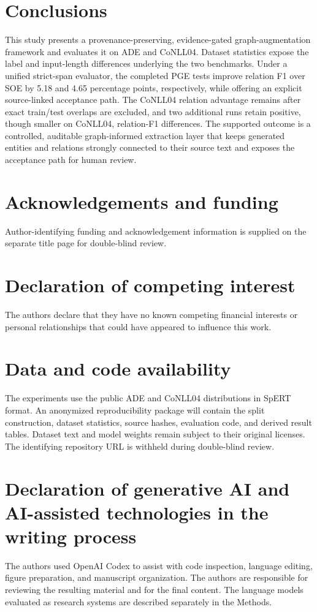 \documentclass[preprint,12pt]{elsarticle}
\begin{document}
\section{Conclusions}
\label{sec:conclusion}
This study presents a provenance-preserving, evidence-gated graph-augmentation
framework and evaluates it on ADE and CoNLL04. Dataset statistics expose the
label and input-length differences underlying the two benchmarks. Under a
unified strict-span evaluator, the completed PGE tests improve relation F1
over SOE by 5.18 and 4.65 percentage points, respectively, while offering an
explicit source-linked acceptance path. The CoNLL04 relation advantage remains
after exact train/test overlaps are excluded, and two additional runs retain
positive, though smaller on CoNLL04, relation-F1 differences. The supported outcome is a
controlled, auditable graph-informed extraction layer that keeps generated
entities and relations strongly connected to their source text and exposes the
acceptance path for human review.

\section*{Acknowledgements and funding}
Author-identifying funding and acknowledgement information is supplied on the
separate title page for double-blind review.
\section*{Declaration of competing interest}
The authors declare that they have no known competing financial interests or
personal relationships that could have appeared to influence this work.
\section*{Data and code availability}
The experiments use the public ADE and CoNLL04 distributions in SpERT format.
An anonymized reproducibility package will contain the split construction,
dataset statistics, source hashes, evaluation code, and derived result tables.
Dataset text and model weights remain subject to their original licenses.
The identifying repository URL is withheld during double-blind review.
\section*{Declaration of generative AI and AI-assisted technologies in the writing process}
The authors used OpenAI Codex to assist with code inspection, language editing,
figure preparation, and manuscript organization. The authors are responsible
for reviewing the resulting material and for the final content. The language
models evaluated as research systems are described separately in the Methods.



\end{document}
